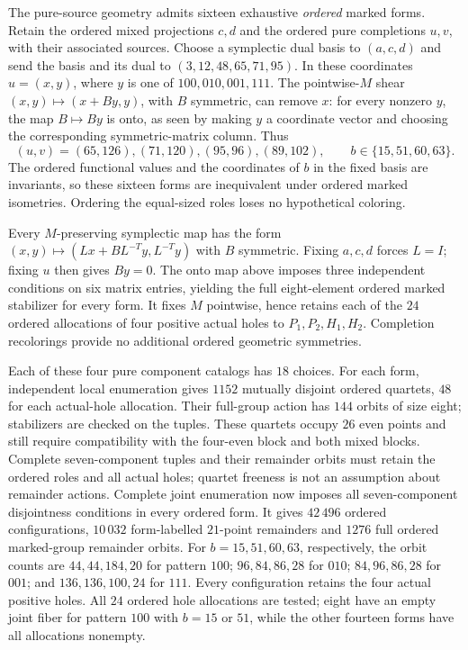 The pure-source geometry admits sixteen exhaustive \emph{ordered}
marked forms. Retain the ordered mixed projections $c,d$ and the
ordered pure completions $u,v$, with their associated sources.
Choose a symplectic dual basis to $(a,c,d)$ and send the basis
and its dual to $(3,12,48,65,71,95)$. In these coordinates
$u=(x,y)$, where $y$ is one of $100,010,001,111$.
The pointwise-$M$ shear $(x,y)\mapsto(x+By,y)$, with $B$ symmetric,
can remove $x$: for every nonzero $y$, the map $B\mapsto By$
is onto, as seen by making $y$ a coordinate vector and choosing
the corresponding symmetric-matrix column. Thus
\[
 (u,v)=(65,126),(71,120),(95,96),(89,102),
 \qquad b\in\{15,51,60,63\}.
\]
The ordered functional values and the coordinates of $b$ in the
fixed basis are invariants, so these sixteen forms are inequivalent
under ordered marked isometries. Ordering the equal-sized roles
loses no hypothetical coloring.

Every $M$-preserving symplectic map has the form
$(x,y)\mapsto(Lx+BL^{-T}y,L^{-T}y)$ with $B$ symmetric.
Fixing $a,c,d$ forces $L=I$; fixing $u$ then gives $By=0$.
The onto map above imposes three independent conditions on six
matrix entries, yielding the full eight-element ordered marked
stabilizer for every form. It fixes $M$ pointwise, hence retains
each of the $24$ ordered allocations of four positive actual holes
to $P_1,P_2,H_1,H_2$. Completion recolorings provide no additional
ordered geometric symmetries.

Each of these four pure component catalogs has $18$ choices.
For each form, independent local enumeration gives $1152$ mutually
disjoint ordered quartets, $48$ for each actual-hole allocation.
Their full-group action has $144$ orbits of size eight; stabilizers
are checked on the tuples. These quartets occupy $26$ even points
and still require compatibility with the four-even block and both
mixed blocks. Complete seven-component tuples and their remainder
orbits must retain the ordered roles and all actual holes;
quartet freeness is not an assumption about remainder actions.
Complete joint enumeration now imposes all seven-component
disjointness conditions in every ordered form. It gives $42\,496$
ordered configurations, $10\,032$ form-labelled $21$-point remainders
and $1276$ full ordered marked-group remainder orbits.
For $b=15,51,60,63$, respectively, the orbit counts are
$44,44,184,20$ for pattern $100$;
$96,84,86,28$ for $010$;
$84,96,86,28$ for $001$; and
$136,136,100,24$ for $111$.
Every configuration retains the four actual positive holes.
All $24$ ordered hole allocations are tested; eight have an empty
joint fiber for pattern $100$ with $b=15$ or $51$, while the other
fourteen forms have all allocations nonempty.

